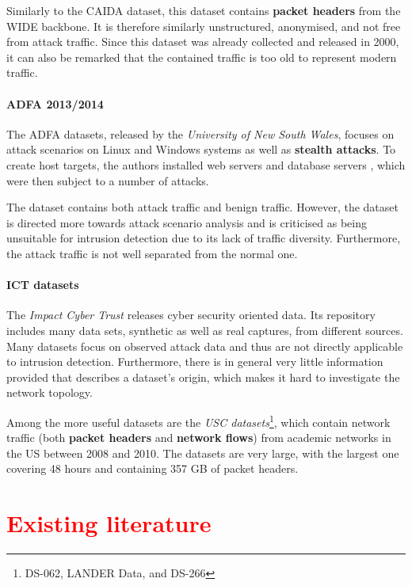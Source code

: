 \documentclass[a4paper,12pt,twoside]{report}
\begin{document}
Similarly to the CAIDA dataset, this dataset contains \textbf{packet headers} from the WIDE backbone. It is therefore similarly unstructured, anonymised, and not free from attack traffic. Since this dataset was already collected and released in 2000, it can also be remarked that the contained traffic is too old to represent modern traffic. 

\subsubsection*{ADFA 2013/2014 \cite{creech2014developing,creech2013generation}}

The ADFA datasets, released by the \textit{University of New South Wales}, focuses on attack scenarios on Linux and Windows systems as well as \textbf{stealth attacks}. To create host targets, the authors  installed web servers and database servers , which were then subject to a number of attacks. 

The dataset contains both attack traffic and benign traffic. However, the dataset is directed more towards attack scenario analysis and is criticised as being unsuitable for intrusion detection due to its lack of traffic diversity. Furthermore, the attack traffic is not well separated from the normal one.

\subsubsection*{ICT datasets \cite{USC2010ICT}}

The \textit{Impact Cyber Trust} releases cyber security oriented data. Its repository includes many data sets, synthetic as well as real captures, from different sources. Many datasets focus on observed attack data and thus are not directly applicable to intrusion detection. Furthermore, there is in general very little information provided that describes a dataset's origin, which makes it hard to investigate the network topology.

Among the more useful datasets are the \textit{USC datasets}\footnote{DS-062, LANDER Data, and DS-266}, which contain network traffic (both \textbf{packet headers} and \textbf{network flows}) from academic networks in the US between 2008 and 2010. The datasets are very large, with the largest one covering 48 hours and containing 357 GB of packet headers. 


\chapter{\textcolor{red}{Existing literature}}
\end{document}
